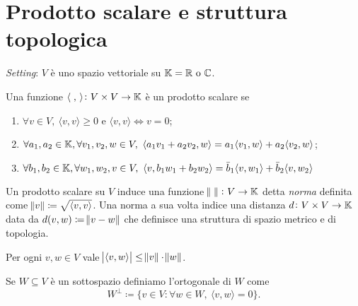 %
%

\section{Prodotto scalare e struttura topologica}
\emph{Setting}: $ V $ è uno spazio vettoriale su $ \mathbb{K} = \mathbb{R} \text{ o } \mathbb{C} $. 

\begin{definition}
    Una funzione $ {\langle \; , \, \rangle} \colon V \times V \to \mathbb{K} $ è un prodotto scalare se 
    \begin{enumerate}[label = (\roman*)]
        \item $ \forall v \in V, \ {\langle v, v \rangle} \geq 0 $ e $ {\langle v, v \rangle} \iff v = 0 $;
        \item $ \forall a_1, a_2 \in \mathbb{K}, \forall v_1, v_2, w \in V, \ {\langle a_1v_1 + a_2v_2, w \rangle} = a_1{\langle v_1, w\rangle} + a_2{\langle v_2, w\rangle} $;
        \item $ \forall b_1, b_2 \in \mathbb{K}, \forall w_1, w_2, v \in V, \ {\langle v, b_1w_1 + b_2w_2 \rangle} = \bar{b}_1{\langle v, w_1\rangle} + \bar{b}_2{\langle v, w_2\rangle} $
    \end{enumerate}
\end{definition}

Un prodotto scalare su $ V $ induce una funzione $ \norm{\;} \colon V \to \mathbb{K}  $ detta \emph{norma} definita come $ {\norm{v} \coloneqq \sqrt{{\langle v, v \rangle}}} $. Una norma a sua volta indice una distanza $ d \colon V \times V \to \mathbb{K} $ data da \linebreak $ d(v, w) \coloneqq \norm{v - w} $ che definisce una struttura di spazio metrico e di topologia.

\begin{proposition}
    Per ogni $ v, w \in V $ vale $ \abs{{\langle v, w \rangle}} \leq \norm{v} \cdot \norm{w} $. 
\end{proposition}

\begin{definition}
    Se $ W \subseteq V $ è un sottospazio definiamo l'ortogonale di $ W $ come 
    \[
        W^{\perp} \coloneqq \{v \in V : \forall w \in W, \ {\langle v, w \rangle} = 0\}.
    \]
\end{definition}

